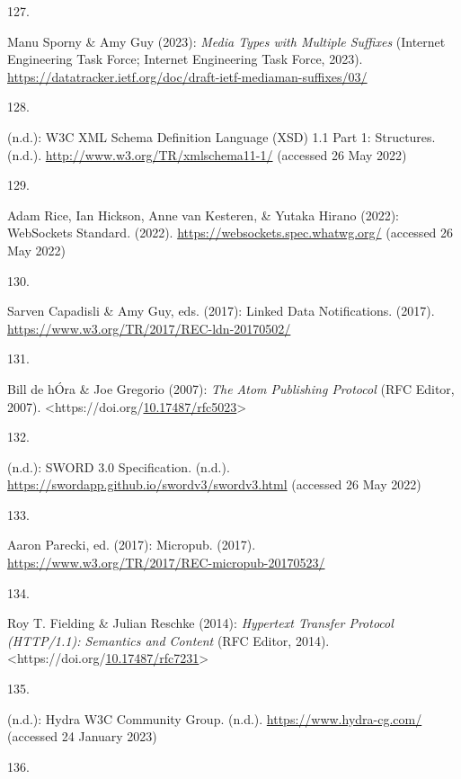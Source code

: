 \begin{thebibliography}{9}
\hypertarget{ref-Draftietfmediamansuffixes00MediaTypes}{}
127.

Manu Sporny \& Amy Guy (2023): \emph{{Media Types with Multiple
Suffixes}} (Internet Engineering Task Force; Internet Engineering Task
Force, 2023).
\url{https://datatracker.ietf.org/doc/draft-ietf-mediaman-suffixes/03/}

\hypertarget{ref-w3-xmlschema11}{}
128.

(n.d.): {W3C XML Schema Definition Language} ({XSD}) 1.1 {Part} 1:
{Structures}. (n.d.). \url{http://www.w3.org/TR/xmlschema11-1/}
(accessed 26 May 2022)

\hypertarget{ref-WebSocketsStandard}{}
129.

Adam Rice, Ian Hickson, Anne van Kesteren, \& Yutaka Hirano (2022):
{WebSockets Standard}. (2022). \url{https://websockets.spec.whatwg.org/}
(accessed 26 May 2022)

\hypertarget{ref-w3-ldn}{}
130.

Sarven Capadisli \& Amy Guy, eds. (2017): Linked {Data Notifications}.
(2017). \url{https://www.w3.org/TR/2017/REC-ldn-20170502/}

\hypertarget{ref-rfc5023}{}
131.

Bill de hÓra \& Joe Gregorio (2007): \emph{The {Atom Publishing
Protocol}} ({RFC Editor}, 2007).
\textless https://doi.org/\href{https://doi.org/10.17487/rfc5023}{10.17487/rfc5023}\textgreater{}

\hypertarget{ref-SWORDSpecification}{}
132.

(n.d.): {SWORD} 3.0 {Specification}. (n.d.).
\url{https://swordapp.github.io/swordv3/swordv3.html} (accessed 26 May
2022)

\hypertarget{ref-w3-micropub}{}
133.

Aaron Parecki, ed. (2017): Micropub. (2017).
\url{https://www.w3.org/TR/2017/REC-micropub-20170523/}

\hypertarget{ref-rfc7231}{}
134.

Roy T. Fielding \& Julian Reschke (2014): \emph{Hypertext {Transfer
Protocol} ({HTTP}/1.1): {Semantics} and {Content}} ({RFC Editor}, 2014).
\textless https://doi.org/\href{https://doi.org/10.17487/rfc7231}{10.17487/rfc7231}\textgreater{}

\hypertarget{ref-HydraW3CCommunity}{}
135.

(n.d.): Hydra {W3C Community Group}. (n.d.).
\url{https://www.hydra-cg.com/} (accessed 24 January 2023)

\hypertarget{ref-Draftkellyjsonhal08}{}
136.


\end{thebibliography}
